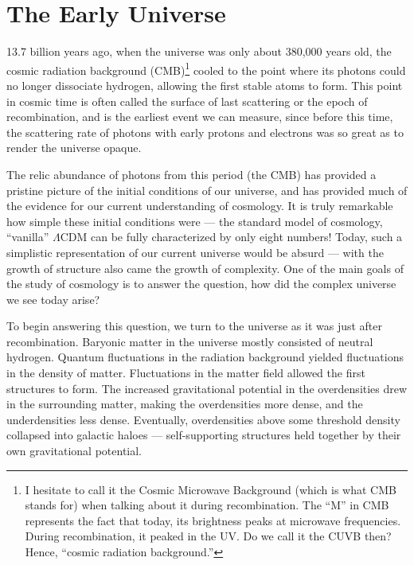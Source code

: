 \section{The Early Universe}\label{sec:Genesis}

13.7 billion years ago, when the universe was only about 380,000 years old, the cosmic radiation
background (CMB)\footnote{I hesitate to
  call it the Cosmic Microwave Background (which is what CMB stands for) when talking about it
  during recombination. The ``M'' in CMB represents the fact that today, its brightness peaks at
  microwave frequencies. During recombination, it peaked in the UV. Do we call it the CUVB then?
Hence, ``cosmic radiation background.''} cooled to the point where 
its photons could no longer dissociate hydrogen, allowing the first stable atoms to form. This point
in cosmic time is often called the surface of last scattering or the epoch of recombination, and is
the earliest event we can measure, since before this time, the scattering rate of photons with early 
protons and electrons was so great as to render the universe opaque. 

The relic abundance of photons from this period (the CMB) has provided a pristine picture of the
initial conditions of our universe, and has provided much of the evidence for our current
understanding of cosmology. It is truly remarkable how simple these initial conditions were --- the
standard model of cosmology, ``vanilla'' $\Lambda$CDM can be fully characterized by only eight
numbers! Today, such a simplistic representation of our current universe would be absurd --- with the
growth of structure also came the growth of complexity. One of the main goals of the study of 
cosmology is to answer the question, how did the complex universe we see today arise?

To begin answering this question, we turn to the universe as it was just after recombination. Baryonic matter 
in the universe mostly consisted of neutral hydrogen. Quantum fluctuations in the radiation background 
yielded fluctuations in the density of matter. Fluctuations in the matter field allowed the first structures 
to form. The increased gravitational potential in the overdensities drew in the surrounding matter, making 
the overdensities more dense, and the underdensities less dense. Eventually, overdensities above some threshold density
collapsed into galactic haloes --- self-supporting structures held together by their own
gravitational potential.

